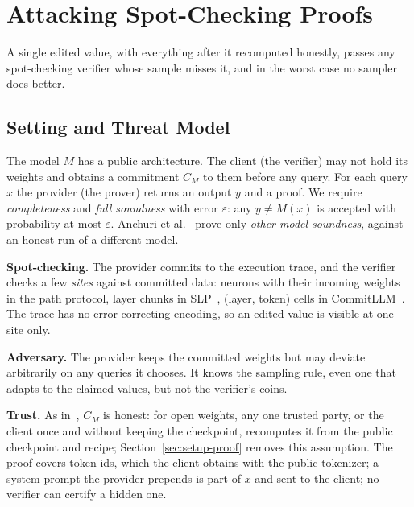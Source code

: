 \providecommand{\para}[1]{\par\noindent\textbf{#1}\quad}
\providecommand{\todo}[1]{\textbf{[TODO: #1]}}

\section{Attacking Spot-Checking Proofs}
\label{sec:attack}

A single edited value, with everything after it recomputed honestly, passes any spot-checking
verifier whose sample misses it, and in the worst case no sampler does better.

\subsection{Setting and Threat Model}
\label{sec:threat}

The model $M$ has a public architecture. The client (the verifier) may not hold its weights and
obtains a commitment $C_M$ to them before any query. For each query $x$ the provider (the
prover) returns an output $y$ and a proof. We require \emph{completeness} and \emph{full soundness}
with error $\varepsilon$: any $y\neq M(x)$ is accepted with probability at most $\varepsilon$.
Anchuri et al.~\cite{anchuri2026verifiable} prove only \emph{other-model soundness}, against an
honest run of a different model.

\para{Spot-checking.} The provider commits to the execution trace, and the verifier checks a few
\emph{sites} against committed data: neurons with their incoming weights in the path protocol,
layer chunks in SLP~\cite{slp}, (layer, token) cells in CommitLLM~\cite{commitllm2026}. The trace
has no error-correcting encoding, so an edited value is visible at one site only.

\para{Adversary.} The provider keeps the committed weights but may deviate arbitrarily on any
queries it chooses. It knows the sampling rule, even one that adapts to the claimed values, but not the verifier's coins.

\para{Trust.} As in~\cite{anchuri2026verifiable}, $C_M$ is honest: for open weights, any one
trusted party, or the client once and without keeping the checkpoint, recomputes it from the
public checkpoint and recipe; Section~\ref{sec:setup-proof} removes this assumption. The proof
covers token ids, which the client obtains with the public tokenizer; a system prompt the provider
prepends is part of $x$ and sent to the client; no verifier can certify a hidden one.


